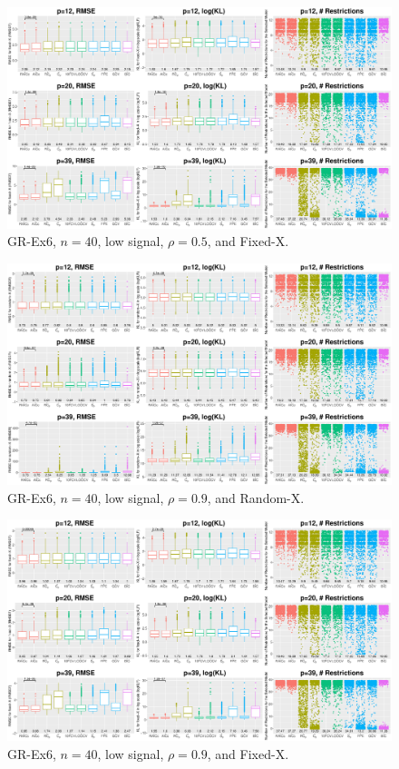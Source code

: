 \begin{figure}[!ht]
\centering
\includegraphics[width=\textwidth]{figures/supplement/fixedx_GR-Ex6_n40_lsnr_rho05.eps}
\caption{GR-Ex6, $n=40$, low signal, $\rho=0.5$, and Fixed-X.}
\end{figure}
\clearpage
\begin{figure}[!ht]
\centering
\includegraphics[width=\textwidth]{figures/supplement/randomx_GR-Ex6_n40_lsnr_rho09.eps}
\caption{GR-Ex6, $n=40$, low signal, $\rho=0.9$, and Random-X.}
\end{figure}
\begin{figure}[!ht]
\centering
\includegraphics[width=\textwidth]{figures/supplement/fixedx_GR-Ex6_n40_lsnr_rho09.eps}
\caption{GR-Ex6, $n=40$, low signal, $\rho=0.9$, and Fixed-X.}
\end{figure}

